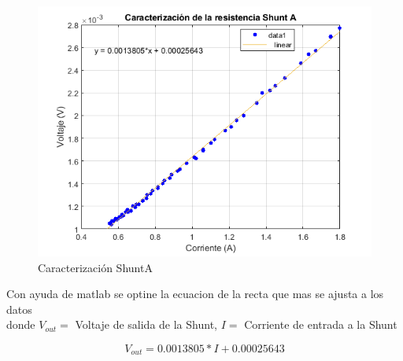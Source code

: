             \begin{figure}[H]
                \begin{center}
                    \includegraphics[width = 15cm]{3Proyecto/CorrienteVoltaje1.png}
                    \caption{ Caracterización ShuntA} 
                    \label{fig:Muestras ShuntA}
                \end{center}
            \end{figure}

            Con ayuda de matlab se optine la ecuacion de la recta que mas se ajusta a los datos\\
            donde $V_{out}=$ Voltaje de salida de la Shunt, $I=$ Corriente de entrada a la Shunt 

            \begin{equation}\label{crt ShuntA}
                V_{out} = 0.0013805*I + 0.00025643 
            \end{equation}

